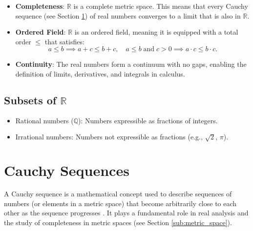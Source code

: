 \begin{itemize}
    \item \textbf{Completeness}: \( \mathbb{R} \) is a complete metric space. This means that every Cauchy sequence (see Section \ref{sub:cauchy}) of real numbers converges to a limit that is also in \( \mathbb{R} \).

\vspace{\baselineskip}\par
    \item \textbf{Ordered Field}: \( \mathbb{R} \) is an ordered field, meaning it is equipped with a total order \( \leq \) that satisfies:
    \[
    a \leq b \implies a + c \leq b + c, \quad a \leq b \; \text{and} \; c > 0 \implies a \cdot c \leq b \cdot c.
    \]

    \item \textbf{Continuity}: The real numbers form a continuum with no gaps, enabling the definition of limits, derivatives, and integrals in calculus.
\end{itemize}

\subsection{Subsets of $\mathbb{R}$} 
    \begin{itemize}
        \item Rational numbers (\( \mathbb{Q} \)): Numbers expressible as fractions of integers.
        \item Irrational numbers: Numbers not expressible as fractions (e.g., \( \sqrt{2} \), \( \pi \)).
    \end{itemize}
    
\section{Cauchy Sequences} \label{sub:cauchy}
A Cauchy sequence is a mathematical concept used to describe sequences of numbers (or elements in a metric space) that become arbitrarily close to each other as the sequence progresses \cite{rudin1976}. It plays a fundamental role in real analysis and the study of completeness in metric spaces (see Section \ref{sub:metric_space}).

